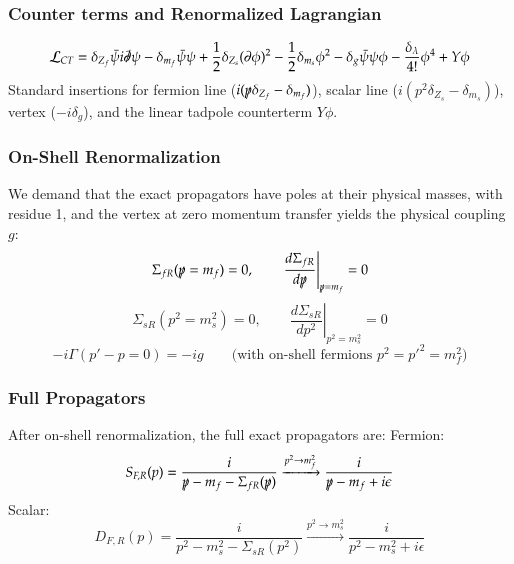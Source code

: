 \documentclass{article}
\begin{document}
\subsubsection*{Counter terms and Renormalized Lagrangian}
\begin{equation}
    \mathcal{L}_{CT} = \delta_{Z_f} \bar{\psi}i\slashed{\partial}\psi - \delta_{m_f} \bar{\psi}\psi + \frac{1}{2}\delta_{Z_s} (\partial\phi)^2 - \frac{1}{2}\delta_{m_s}\phi^2 - \delta_g \bar{\psi}\psi\phi - \frac{\delta_\lambda}{4!}\phi^4 + Y\phi
\end{equation}
Standard insertions for fermion line ($i(\slashed{p}\delta_{Z_f} - \delta_{m_f})$), scalar line ($i(p^2\delta_{Z_s} - \delta_{m_s})$), vertex ($-i\delta_g$), and the linear tadpole counterterm $Y\phi$.
\subsubsection*{On-Shell Renormalization}
We demand that the exact propagators have poles at their physical masses, with residue 1, and the vertex at zero momentum transfer yields the physical coupling $g$:
\begin{equation}
    \Sigma_{fR}(\slashed{p}=m_f) = 0, \qquad \left.\frac{d\Sigma_{fR}}{d\slashed{p}}\right|_{\slashed{p}=m_f} = 0
\end{equation}
\begin{equation}
    \Sigma_{sR}(p^2=m_s^2) = 0, \qquad \left.\frac{d\Sigma_{sR}}{dp^2}\right|_{p^2=m_s^2} = 0
\end{equation}
\begin{equation}
    -i\Gamma(p'-p=0) = -ig \qquad \text{(with on-shell fermions $p^2=p'^2=m_f^2$)}
\end{equation}
\subsubsection*{Full Propagators}
After on-shell renormalization, the full exact propagators are:
Fermion:
\begin{equation}
    S_{F,R}(p) = \frac{i}{\slashed{p} - m_f - \Sigma_{fR}(\slashed{p})} \xrightarrow{p^2 \to m_f^2} \frac{i}{\slashed{p} - m_f + i\epsilon}
\end{equation}
Scalar:
\begin{equation}
    D_{F,R}(p) = \frac{i}{p^2 - m_s^2 - \Sigma_{sR}(p^2)} \xrightarrow{p^2 \to m_s^2} \frac{i}{p^2 - m_s^2 + i\epsilon}
\end{equation}
\end{document}
